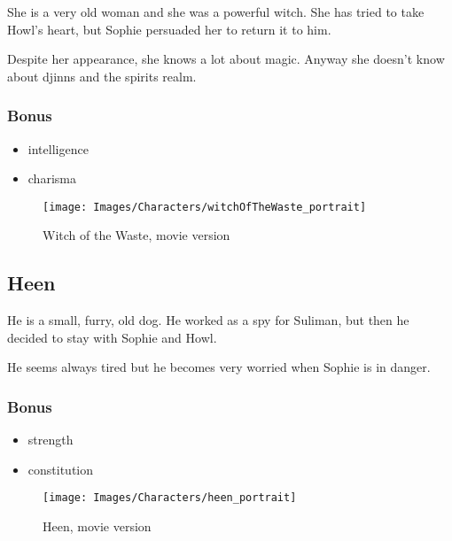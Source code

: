 \begin{minipage}{0.5\textwidth}
She is a very old woman and she was a powerful witch. She has tried to take Howl’s heart, but Sophie persuaded her to return it to him.

Despite her appearance, she knows a lot about magic. Anyway she doesn’t know about djinns and the spirits realm.

\subsubsection{Bonus}
\begin{itemize}
	\item intelligence
	\item charisma
\end{itemize}

\end{minipage}%
%
\hfill\begin{minipage}{0.4\textwidth}
  \begin{figure}[H]
    \hfill\texttt{[image: Images/Characters/witchOfTheWaste\_portrait]}
    \caption{Witch of the Waste, movie version}
  \end{figure}
\end{minipage}

\subsection{Heen}

\begin{minipage}{0.5\textwidth}
He is a small, furry, old dog. He worked as a spy for Suliman, but then he decided to stay with Sophie and Howl.

He seems always tired but he becomes very worried when Sophie is in danger.

\subsubsection{Bonus}
\begin{itemize}
	\item strength
	\item constitution
\end{itemize}

\end{minipage}%
%
\hfill\begin{minipage}{0.4\textwidth}
  \begin{figure}[H]
    \hfill\texttt{[image: Images/Characters/heen\_portrait]}
    \caption{Heen, movie version}
  \end{figure}
\end{minipage}%
%

